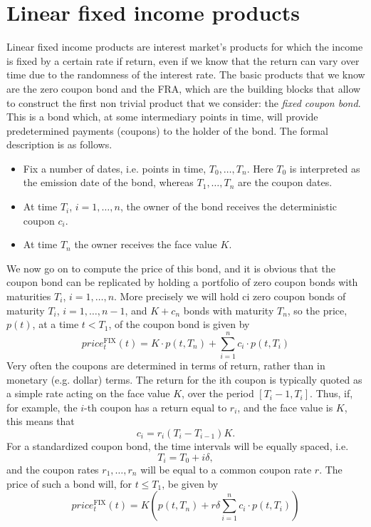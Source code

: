 \section{Linear fixed income products}
Linear fixed income products are interest market's products for which the income is fixed by a certain rate if return, even if we know that the return can vary over time due to the randomness of the interest rate. The basic products that we know are the zero coupon bond and the FRA, which are the building blocks that allow to construct the first non trivial product that we consider: the \emph{fixed coupon bond}. This is a bond which, at some intermediary points in time, will provide predetermined payments (coupons) to the holder of the bond. The formal description is as follows.
\begin{itemize}
    \item Fix a number of dates, i.e. points in time, $T_0, \dots, T_n$. Here $T_0$ is interpreted as the emission date of the bond, whereas $T_1, \dots, T_n$ are the coupon dates.
    \item At time $T_i$, $i = 1,\dots, n$, the owner of the bond receives the deterministic
    coupon $c_i$.
    \item At time $T_n$ the owner receives the face value $K$.
\end{itemize}
We now go on to compute the price of this bond, and it is obvious that the coupon bond can be replicated by holding a portfolio of zero coupon bonds with maturities $T_i$, $i = 1,\dots, n$. More precisely we will hold ci zero coupon bonds of maturity $T_i$, $i = 1,\dots, n-1$, and $K+c_n$ bonds with maturity $T_n$, so the price, $p(t)$, at a time $t < T_1$, of the coupon bond is given by
\begin{equation}
    price_t^{\text{FIX}}(t) = K\cdot p(t,T_n) + \sum_{i=1}^n c_i\cdot p(t,T_i)
\end{equation}
Very often the coupons are determined in terms of return, rather than in monetary (e.g. dollar) terms. The return for the ith coupon is typically quoted as a simple rate acting on the face value $K$, over the period $[T_i-1,T_i]$. Thus, if, for example, the $i$-th coupon has a return equal to $r_i$, and the face value is $K$, this means that
\begin{equation*}
    c_i = r_i(T_i - T_{i-1})K.
\end{equation*}
For a standardized coupon bond, the time intervals will be equally spaced, i.e.
\begin{equation*}
    T_i = T_0 + i\delta,
\end{equation*}
and the coupon rates $r_1,\dots,r_n$ will be equal to a common coupon rate $r$. The
price of such a bond will, for $t \le T_1$, be given by
\begin{equation}
    price_t^{\text{FIX}}(t) = K\left(p(t,T_n) + r\delta\sum_{i=1}^n c_i\cdot p(t,T_i)\right)
\end{equation}

